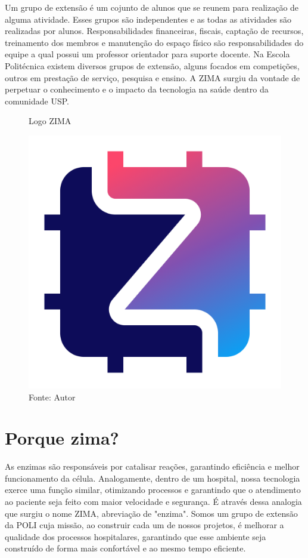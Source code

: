\documentclass[../poliXuniversity_hospital_(USP)_report.tex]{subfiles}
\begin{document}
Um grupo de extensão é um cojunto de alunos que se reunem para realização de alguma atividade. Esses grupos são independentes e as todas as atividades são realizadas por alunos. Responsabilidades financeiras, fiscais, captação de recursos, treinamento dos membros e manutenção do espaço físico são responsabilidades do equipe a qual possui um professor orientador para suporte docente. Na Escola Politécnica existem diversos grupos de extensão, alguns focados em competições, outros em prestação de serviço, pesquisa e ensino. A ZIMA surgiu da vontade de perpetuar o conhecimento e o impacto da tecnologia na saúde dentro da comunidade USP.

\begin{figure}[h]
\centering
    \caption{Logo ZIMA}
    \centering %
    \includegraphics[width=14cm]{images/logo_zima.png}
    \caption*{Fonte: Autor}
    \label{figura: Logo ZIMA}
\end{figure}
\chapter{Porque zima?}
As enzimas são responsáveis por catalisar reações, garantindo eficiência e melhor funcionamento da célula. Analogamente, dentro de um hospital, nossa tecnologia exerce uma função similar, otimizando processos e garantindo que o atendimento ao paciente seja feito com maior velocidade e segurança. É através dessa analogia que surgiu o nome ZIMA, abreviação de "enzima". Somos um grupo de extensão da POLI cuja missão, ao construir cada um de nossos projetos, é melhorar a qualidade dos processos hospitalares, garantindo que esse ambiente seja construído de forma mais confortável e ao mesmo tempo eficiente.
\end{document}

